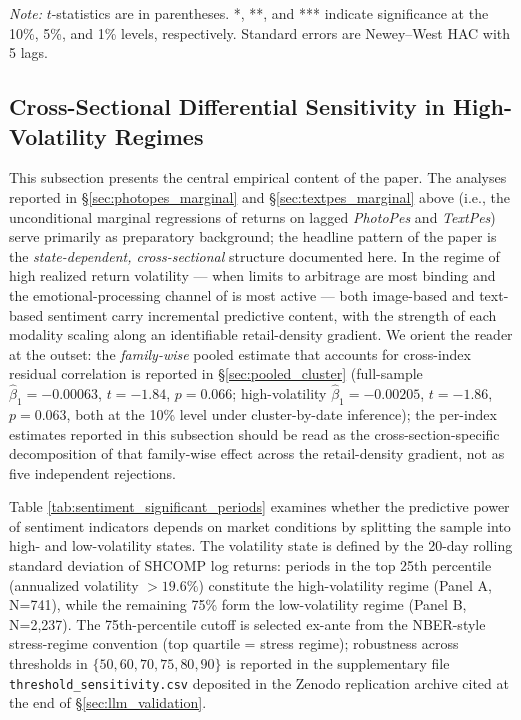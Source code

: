 \documentclass[AER]{AEA}
\begin{document}
\begin{table}[h!]
    \vspace{0.2cm}
    \footnotesize
    \textit{Note:} $t$-statistics are in parentheses. *, **, and *** indicate significance at the 10\%, 5\%, and 1\% levels, respectively. Standard errors are Newey--West HAC with 5 lags.
\end{table}

\subsection{Cross-Sectional Differential Sensitivity in High-Volatility Regimes}
\label{sec:conditional_analysis}

This subsection presents the central empirical content of the paper. The analyses reported in \S\ref{sec:photopes_marginal} and \S\ref{sec:textpes_marginal} above (i.e., the unconditional marginal regressions of returns on lagged \textit{PhotoPes} and \textit{TextPes}) serve primarily as preparatory background; the headline pattern of the paper is the \emph{state-dependent, cross-sectional} structure documented here. In the regime of high realized return volatility --- when limits to arbitrage are most binding and the emotional-processing channel of \citet{loewenstein2001risk} is most active --- both image-based and text-based sentiment carry incremental predictive content, with the strength of each modality scaling along an identifiable retail-density gradient. We orient the reader at the outset: the \emph{family-wise} pooled estimate that accounts for cross-index residual correlation is reported in \S\ref{sec:pooled_cluster} (full-sample $\hat\beta_1=-0.00063$, $t=-1.84$, $p=0.066$; high-volatility $\hat\beta_1=-0.00205$, $t=-1.86$, $p=0.063$, both at the 10\% level under cluster-by-date inference); the per-index estimates reported in this subsection should be read as the cross-section-specific decomposition of that family-wise effect across the retail-density gradient, not as five independent rejections.

Table \ref{tab:sentiment_significant_periods} examines whether the predictive power of sentiment indicators depends on market conditions by splitting the sample into high- and low-volatility states. The volatility state is defined by the 20-day rolling standard deviation of SHCOMP log returns: periods in the top 25th percentile (annualized volatility $> 19.6\%$) constitute the high-volatility regime (Panel A, N=741), while the remaining 75\% form the low-volatility regime (Panel B, N=2,237). The 75th-percentile cutoff is selected ex-ante from the NBER-style stress-regime convention (top quartile = stress regime); robustness across thresholds in $\{50, 60, 70, 75, 80, 90\}$ is reported in the supplementary file \texttt{threshold\_sensitivity.csv} deposited in the Zenodo replication archive cited at the end of \S\ref{sec:llm_validation}.
\end{document}
